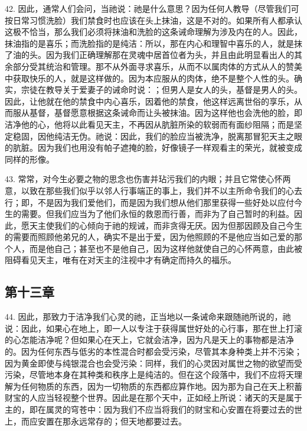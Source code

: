 42. 因此，通常人们会问，当祂说：祂是什么意思？因为任何人教导（尽管我们可按日常习惯洗脸）我们禁食时也应该在头上抹油，这是不对的。如果所有人都承认这极不恰当，那么我们必须将抹油和洗脸的这条诫命理解为涉及内在的人。因此，抹油指的是喜乐；而洗脸指的是纯洁：所以，那在内心和理智中喜乐的人，就是抹了油的头。因为我们正确理解那在灵魂中居首位者为头，并且由此明显看出人的其余部分受其统治和管理。那不从外面寻求喜乐，从而不以属肉体的方式从人的赞美中获取快乐的人，就是这样做的。因为本应服从的肉体，绝不是整个人性的头。确实，宗徒在教导关于爱妻子的诫命时说：；但男人是女人的头，基督是男人的头。因此，让他就在他的禁食中内心喜乐，因着他的禁食，他这样远离世俗的享乐，从而服从基督，基督愿意根据这条诫命而让头被抹油。因为这样他也会洗他的脸，即洁净他的心，他将以此看见天主，不再因从肮脏所染的软弱而有面纱阻隔；而是坚定稳固，因他纯洁无伪。祂说：因此，我们的脸应当被洗净，脱离那冒犯天主之眼的肮脏。因为我们也用没有帕子遮掩的脸，好像镜子一样观看主的荣光，就被变成同样的形像。\par

43. 常常，对今生必要之物的思念也伤害并玷污我们的内眼；并且它常使心怀两意，以致在那些我们似乎以邻人行事端正的事上，我们并不以主所命令我们的心去行；即，不是因为我们爱他们，而是因为我们想从他们那里获得一些好处以应付今生的需要。但我们应当为了他们永恒的救恩而行善，而非为了自己暂时的利益。因此，愿天主使我们的心倾向于祂的规诫，而非贪得无厌。因为但那因顾及自己今生的需要而照顾他弟兄的人，确实不是出于爱，因为他照顾的不是他应当如己爱的那个人，而是他自己；甚至也不是他自己，因为这样他就使自己的心怀两意，由此被阻碍看见天主，唯有在对天主的注视中才有确定而持久的福乐。\par


\subsection{第十三章}

44. 因此，那致力于洁净我们心灵的祂，正当地以一条诫命来跟随祂所说的，祂说：因此，如果心在地上，即一人以专注于获得属世好处的心行事，那在世上打滚的心怎能洁净呢？但如果心在天上，它就会洁净，因为凡是天上的事物都是洁净的。因为任何东西与低劣的本性混合时都会受污染，尽管其本身种类上并不污染；因为黄金即使与纯银混合也会受污染：同样，我们的心灵因对属世之物的欲望而受污染，尽管地本身在其种类和秩序上是纯洁的。但在这个段落中，我们不应将天理解为任何物质的东西，因为一切物质的东西都应算作地。因为那为自己在天上积蓄财宝的人应当轻视整个世界。因此是在那个天中，正如经上所说：诸天的天是属于主的，即在属灵的穹苍中：因为我们不应当将我们的财宝和心安置在将要过去的世上，而应安置在那永远常存的；但天地都要过去。\par

